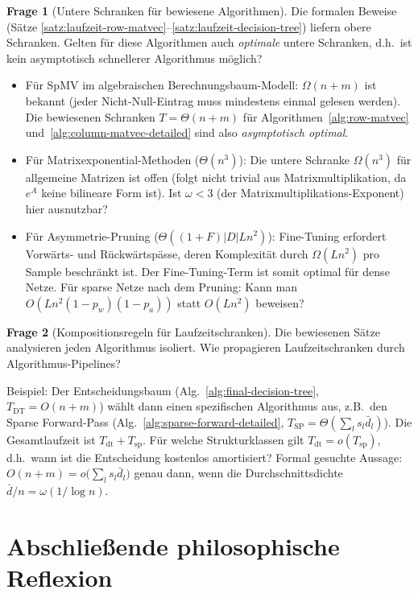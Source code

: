 \documentclass[a4paper,12pt]{report}
\theoremstyle{definition}
\newtheorem{frage}{Frage}
\begin{document}
	\begin{frage}[Untere Schranken für bewiesene Algorithmen]
		Die formalen Beweise (Sätze \ref{satz:laufzeit-row-matvec}--\ref{satz:laufzeit-decision-tree}) liefern obere Schranken. Gelten für diese Algorithmen auch \emph{optimale} untere Schranken, d.h.\ ist kein asymptotisch schnellerer Algorithmus möglich?

		\begin{itemize}
			\item Für SpMV im algebraischen Berechnungsbaum-Modell: $\Omega(n + m)$ ist bekannt (jeder Nicht-Null-Eintrag muss mindestens einmal gelesen werden). Die bewiesenen Schranken $T = \Theta(n+m)$ für Algorithmen~\ref{alg:row-matvec} und~\ref{alg:column-matvec-detailed} sind also \emph{asymptotisch optimal}.
			\item Für Matrixexponential-Methoden ($\Theta(n^3)$): Die untere Schranke $\Omega(n^3)$ für allgemeine Matrizen ist offen (folgt nicht trivial aus Matrixmultiplikation, da $e^A$ keine bilineare Form ist). Ist $\omega < 3$ (der Matrixmultiplikations-Exponent) hier ausnutzbar?
			\item Für Asymmetrie-Pruning ($\Theta((1+F)|D|Ln^2)$): Fine-Tuning erfordert Vorwärts- und Rückwärtspässe, deren Komplexität durch $\Omega(Ln^2)$ pro Sample beschränkt ist. Der Fine-Tuning-Term ist somit optimal für dense Netze. Für sparse Netze nach dem Pruning: Kann man $O(Ln^2(1-p_w)(1-p_a))$ statt $O(Ln^2)$ beweisen?
		\end{itemize}
	\end{frage}

	\begin{frage}[Kompositionsregeln für Laufzeitschranken]
		Die bewiesenen Sätze analysieren jeden Algorithmus isoliert. Wie propagieren Laufzeitschranken durch Algorithmus-Pipelines?

		Beispiel: Der Entscheidungsbaum (Alg.~\ref{alg:final-decision-tree}, $T_{\mathrm{DT}} = O(n+m)$) wählt dann einen spezifischen Algorithmus aus, z.B.\ den Sparse Forward-Pass (Alg.~\ref{alg:sparse-forward-detailed}, $T_{\mathrm{SP}} = \Theta(\sum_l s_l \bar{d}_l)$). Die Gesamtlaufzeit ist $T_{\mathrm{dt}} + T_{\mathrm{sp}}$. Für welche Strukturklassen gilt $T_{\mathrm{dt}} = o(T_{\mathrm{sp}})$, d.h.\ wann ist die Entscheidung kostenlos amortisiert? Formal gesuchte Aussage: $O(n+m) = o\!\bigl(\sum_l s_l \bar{d}_l\bigr)$ genau dann, wenn die Durchschnittsdichte $\bar{d}/n = \omega(1/\log n)$.
	\end{frage}

	\section{Abschließende philosophische Reflexion}
	
\end{document}
